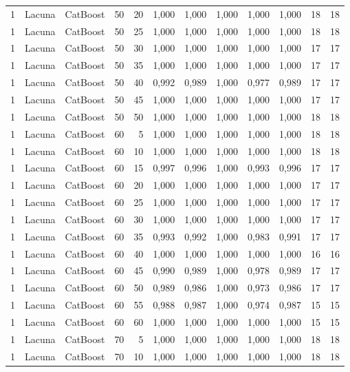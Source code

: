 \begin{longtable}{@{}rllrrrrrrrrr@{}}
1 & Lacuna & CatBoost & 50 & 20 & 1,000 & 1,000 & 1,000 & 1,000 & 1,000 & 18 & 18 \\
1 & Lacuna & CatBoost & 50 & 25 & 1,000 & 1,000 & 1,000 & 1,000 & 1,000 & 18 & 18 \\
1 & Lacuna & CatBoost & 50 & 30 & 1,000 & 1,000 & 1,000 & 1,000 & 1,000 & 17 & 17 \\
1 & Lacuna & CatBoost & 50 & 35 & 1,000 & 1,000 & 1,000 & 1,000 & 1,000 & 17 & 17 \\
1 & Lacuna & CatBoost & 50 & 40 & 0,992 & 0,989 & 1,000 & 0,977 & 0,989 & 17 & 17 \\
1 & Lacuna & CatBoost & 50 & 45 & 1,000 & 1,000 & 1,000 & 1,000 & 1,000 & 17 & 17 \\
1 & Lacuna & CatBoost & 50 & 50 & 1,000 & 1,000 & 1,000 & 1,000 & 1,000 & 18 & 18 \\
1 & Lacuna & CatBoost & 60 & 5 & 1,000 & 1,000 & 1,000 & 1,000 & 1,000 & 18 & 18 \\
1 & Lacuna & CatBoost & 60 & 10 & 1,000 & 1,000 & 1,000 & 1,000 & 1,000 & 18 & 18 \\
1 & Lacuna & CatBoost & 60 & 15 & 0,997 & 0,996 & 1,000 & 0,993 & 0,996 & 17 & 17 \\
1 & Lacuna & CatBoost & 60 & 20 & 1,000 & 1,000 & 1,000 & 1,000 & 1,000 & 17 & 17 \\
1 & Lacuna & CatBoost & 60 & 25 & 1,000 & 1,000 & 1,000 & 1,000 & 1,000 & 17 & 17 \\
1 & Lacuna & CatBoost & 60 & 30 & 1,000 & 1,000 & 1,000 & 1,000 & 1,000 & 17 & 17 \\
1 & Lacuna & CatBoost & 60 & 35 & 0,993 & 0,992 & 1,000 & 0,983 & 0,991 & 17 & 17 \\
1 & Lacuna & CatBoost & 60 & 40 & 1,000 & 1,000 & 1,000 & 1,000 & 1,000 & 16 & 16 \\
1 & Lacuna & CatBoost & 60 & 45 & 0,990 & 0,989 & 1,000 & 0,978 & 0,989 & 17 & 17 \\
1 & Lacuna & CatBoost & 60 & 50 & 0,989 & 0,986 & 1,000 & 0,973 & 0,986 & 17 & 17 \\
1 & Lacuna & CatBoost & 60 & 55 & 0,988 & 0,987 & 1,000 & 0,974 & 0,987 & 15 & 15 \\
1 & Lacuna & CatBoost & 60 & 60 & 1,000 & 1,000 & 1,000 & 1,000 & 1,000 & 15 & 15 \\
1 & Lacuna & CatBoost & 70 & 5 & 1,000 & 1,000 & 1,000 & 1,000 & 1,000 & 18 & 18 \\
1 & Lacuna & CatBoost & 70 & 10 & 1,000 & 1,000 & 1,000 & 1,000 & 1,000 & 18 & 18 \\

\end{longtable}

